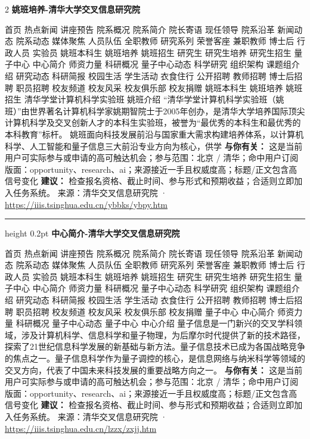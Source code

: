 \documentclass[10.5pt]{ctexart}
\begin{document}
\begin{multicols}{2}
{\large\bfseries 姚班培养-清华大学交叉信息研究院}\par
首页 热点新闻 讲座预告 院系概况 院系简介 院长寄语 现任领导 院系沿革 新闻动态 院系动态 媒体聚焦 人员队伍 全职教师 研究系列 荣誉客座 兼职教师 博士后 行政人员 实验员 姚班本科生 姚班培养 姚班招生 研究生 研究生培养 研究生招生 量子中心 中心简介 师资力量 科研概况 量子中心动态 科学研究 组织架构 课题组介绍 研究动态 科研简报 校园生活 学生活动 衣食住行 公开招聘 教师招聘 博士后招聘 职员招聘 校友频道 校友风采 校友俱乐部 校友捐赠 姚班本科生 姚班培养 姚班招生 清华学堂计算机科学实验班 姚班介绍 “清华学堂计算机科学实验班（姚班）”由世界著名计算机科学家姚期智院士于2005年创办，是清华大学培养国际顶尖计算机科学及交叉创新人才的本科生实验班，被誉为“最优秀的本科生和最优秀的本科教育”标杆。 姚班面向科技发展前沿与国家重大需求构建培养体系，以计算机科学、人工智能和量子信息三大前沿专业方向为核心，供学
\textbf{与你有关：} 这是当前用户可实际参与或申请的高可触达机会；参与范围：北京 / 清华；命中用户订阅版面：opportunity、research、ai；来源接近一手且权威度高；标题/正文包含高信号变化
\textbf{建议：} 检查报名资格、截止时间、参与形式和预期收益；合适则立即加入任务系统。
{\footnotesize\color{ormuted} 来源：清华交叉信息研究院 · \url{https://iiis.tsinghua.edu.cn/ybbks/ybpy.htm}}
\vspace{2mm}
\hrule height 0.2pt
\vspace{2mm}
{\large\bfseries 中心简介-清华大学交叉信息研究院}\par
首页 热点新闻 讲座预告 院系概况 院系简介 院长寄语 现任领导 院系沿革 新闻动态 院系动态 媒体聚焦 人员队伍 全职教师 研究系列 荣誉客座 兼职教师 博士后 行政人员 实验员 姚班本科生 姚班培养 姚班招生 研究生 研究生培养 研究生招生 量子中心 中心简介 师资力量 科研概况 量子中心动态 科学研究 组织架构 课题组介绍 研究动态 科研简报 校园生活 学生活动 衣食住行 公开招聘 教师招聘 博士后招聘 职员招聘 校友频道 校友风采 校友俱乐部 校友捐赠 量子中心 中心简介 师资力量 科研概况 量子中心动态 量子中心 中心介绍 量子信息是一门新兴的交叉学科领域，涉及计算机科学、信息科学和量子物理，为后摩尔时代提供了新的技术路径，探索了21世纪信息科学发展的新基础与新方法。量子信息技术已成为各国战略竞争的焦点之一。量子信息科学作为量子调控的核心，是信息网络与纳米科学等领域的交叉方向，代表了中国未来科技发展的重要战略方向之一。
\textbf{与你有关：} 这是当前用户可实际参与或申请的高可触达机会；参与范围：北京 / 清华；命中用户订阅版面：opportunity、research、ai；来源接近一手且权威度高；标题/正文包含高信号变化
\textbf{建议：} 检查报名资格、截止时间、参与形式和预期收益；合适则立即加入任务系统。
{\footnotesize\color{ormuted} 来源：清华交叉信息研究院 · \url{https://iiis.tsinghua.edu.cn/lzzx/zxjj.htm}}

\end{multicols}
\end{document}
